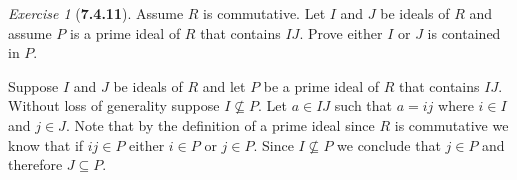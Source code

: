 \documentclass[12pt]{amsart}
\makeatletter
\theoremstyle{remark}
\newtheorem*{exercise}{Exercise}%
\renewenvironment{proof}[1][\proofname]{\par\doublespacing
  \pushQED{\qed}%
  \normalfont \topsep6\p@\@plus6\p@\relax
  \list{}{%
    \settowidth{\leftmargin}{\itshape\proofname:\hskip\labelsep}%
    \setlength{\labelwidth}{0pt}%
    \setlength{\itemindent}{-\leftmargin}%
  }%
  \item[\hskip\labelsep\itshape#1\@addpunct{:}]\ignorespaces
}{%
  \popQED\endlist\@endpefalse
  \singlespacing
}
\theoremstyle{mycomment}
\makeatother
\begin{document}
\begin{exercise}[\textbf{7.4.11}] Assume $R$ is commutative. Let $I$ and $J$ be ideals of $R$ and assume $P$ is a prime ideal of $R$ that contains $IJ$. Prove either $I$ or $J$ is contained in $P$. 
    \begin{proof} Suppose $I$ and $J$ be ideals of $R$ and let $P$ be a prime ideal of $R$ that contains $IJ$. Without loss of generality suppose $I \not\subseteq P$. 
      Let $a \in IJ$ such that $a = ij$ where $i \in I$ and $j \in J$. Note that by the definition of a prime ideal since $R$ is commutative we know that if $ij \in P$ either $i \in P$ or $j \in P$. Since $I \not\subseteq P$ we conclude that 
      $j \in P$ and therefore $J \subseteq P$. 
  \end{proof}
\end{exercise}
\vspace{.5in}
\end{document}
